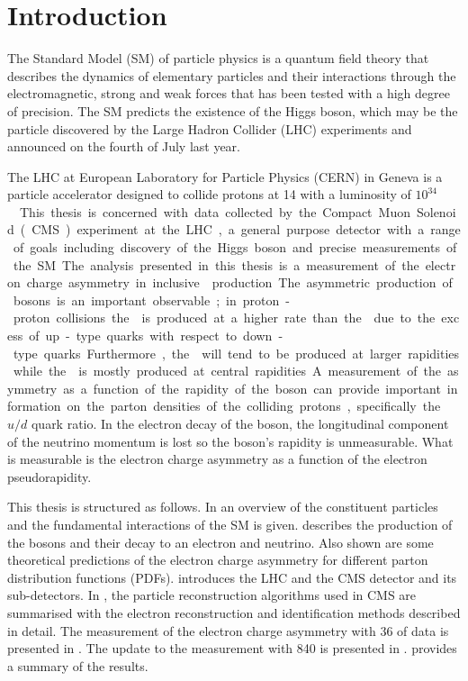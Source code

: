 \chapter{Introduction}
\label{chap:introduction}

The Standard Model (SM) of particle physics is a quantum field theory that
describes the dynamics of elementary particles and their interactions through
the electromagnetic, strong and weak forces that has been tested with a high
degree of precision.
The {SM} predicts the existence of the Higgs boson, which may be the particle
discovered by the Large Hadron Collider (LHC) experiments and announced on the
fourth of July last year\cite{chatrchyan2012observation,aad2012observation}.

The LHC at European Laboratory for Particle Physics
(CERN) in Geneva is a particle accelerator designed to collide protons at
\unit{14}{\TeV} with a luminosity of \unit{$10^{34}$}{\lumiunits}. This thesis
is concerned with data collected by the Compact Muon Solenoid (CMS) experiment at
the {LHC}, a general purpose detector with a range of goals including discovery
of the Higgs boson and precise measurements of the {SM}.

The analysis presented in this thesis is a measurement of the electron charge
asymmetry in inclusive \PW production. The asymmetric production of \PW bosons
is an important observable; in proton-proton collisions the \PWp is  produced at
a higher rate than the \PWm due to the excess of up-type quarks with respect to
down-type quarks. Furthermore, the \PWp will tend to be produced at larger
rapidities while the \PWm is mostly produced at central rapidities. A
measurement of the asymmetry as a function of the rapidity of the boson can
provide important information on the parton densities of the colliding protons,
specifically the ${u}/{d}$ quark ratio.  In the electron decay of the \PW boson,
the longitudinal component of the neutrino momentum is lost so the boson's
rapidity is unmeasurable. What is measurable is the electron charge asymmetry as
a function of the electron pseudorapidity. 

This thesis is structured as follows. In  an overview of the
constituent particles  and the fundamental interactions of the {SM} is given.
 describes the production of the \PW bosons and their
decay to an electron and neutrino. Also shown are some theoretical predictions
of the electron charge asymmetry for different parton distribution functions
(PDFs).   introduces the {LHC} and the {CMS} detector and
its sub-detectors.  In , the particle reconstruction
algorithms used in CMS are summarised with the electron reconstruction and
identification methods described in detail. The measurement of the electron
charge asymmetry with \unit{36}{\invpb} of data is presented in
. The update to the measurement with
\unit{840}{\invpb} is presented in .
 provides a summary of the results.




